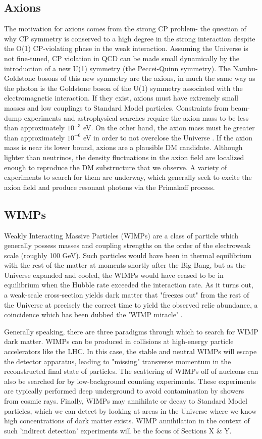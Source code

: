 \subsection{Axions}
The motivation for axions comes from the strong CP problem- the question of why CP symmetry is conserved to a high degree in the strong interaction despite the O(1) CP-violating phase in the weak interaction. Assuming the Universe is not fine-tuned, CP violation in QCD can be made small dynamically by the introduction of a new U(1) symmetry (the Peccei-Quinn symmetry). The Nambu-Goldstone bosons of this new symmetry are the axions, in much the same way as the photon is the Goldstone boson of the U(1) symmetry associated with the electromagnetic interaction. 
If they exist, axions must have extremely small masses and low couplings to Standard Model particles. Constraints from beam-dump experiments and astrophysical searches require the axion mass to be less than approximately $10^{-3}$ eV. On the other hand, the axion mass must be greater than approximately $10^{-6}$ eV in order to not overclose the Universe \cite{bertone_particle_2010}. If the axion mass is near its lower bound, axions are a plausible DM candidate. Although lighter than neutrinos, the density fluctuations in the axion field are localized enough to reproduce the DM substructure that we observe. A variety of experiments to search for them are underway, which generally seek to excite the axion field and produce resonant photons via the Primakoff process. 

\subsection{WIMPs}
Weakly Interacting Massive Particles (WIMPs) are a class of particle which generally possess masses and coupling strengths on the order of the electroweak scale (roughly 100 GeV). 
Such particles would have been in thermal equilibrium with the rest of the matter at moments shortly after the Big Bang, but as the Universe expanded and cooled, the WIMPs would have ceased to be in equilibrium when the Hubble rate exceeded the interaction rate. As it turns out, a weak-scale cross-section yields dark matter that "freezes out" from the rest of the Universe at precisely the correct time to yield the observed relic abundance, a coincidence which has been dubbed the 'WIMP miracle' \cite{bertone_particle_2010}.

Generally speaking, there are three paradigms through which to search for WIMP dark matter.
WIMPs can be produced in collisions at high-energy particle accelerators like the LHC. In this case, the stable and neutral WIMPs will escape the detector apparatus, leading to "missing" transverse momentum in the reconstructed final state of particles. The scattering of WIMPs off of nucleons can also be searched for by low-background counting experiments. These experiments are typically performed deep underground to avoid contamination by showers from cosmic rays.
Finally, WIMPs may annihilate or decay to Standard Model particles, which we can detect by looking at areas in the Universe where we know high concentrations of dark matter exists. WIMP annihilation in the context of such 'indirect detection' experiments will be the focus of Sections X \& Y. 

